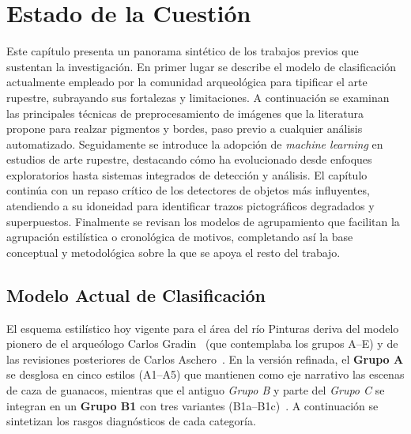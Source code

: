 \section{Estado de la Cuestión}\label{sec:estado_cuestion}

Este capítulo presenta un panorama sintético de los trabajos previos que sustentan la investigación.
En primer lugar se describe el modelo de clasificación actualmente empleado por la comunidad arqueológica para tipificar el arte rupestre, subrayando sus fortalezas y limitaciones.
A continuación se examinan las principales técnicas de preprocesamiento de imágenes que la literatura propone para realzar pigmentos y bordes, paso previo a cualquier análisis automatizado.
Seguidamente se introduce la adopción de \emph{machine learning} en estudios de arte rupestre, destacando cómo ha evolucionado desde enfoques exploratorios hasta sistemas integrados de detección y análisis.
El capítulo continúa con un repaso crítico de los detectores de objetos más influyentes, atendiendo a su idoneidad para identificar trazos pictográficos degradados y superpuestos.
Finalmente se revisan los modelos de agrupamiento que facilitan la agrupación estilística o cronológica de motivos, completando así la base conceptual y metodológica sobre la que se apoya el resto del trabajo.

\subsection{Modelo Actual de Clasificación}

El esquema estilístico hoy vigente para el área del río Pinturas deriva del modelo pionero de el arqueólogo Carlos Gradin~\cite{gradin1979} (que contemplaba los grupos A–E) y de las revisiones posteriores de Carlos Aschero~\cite{aschero2012,aschero2018b}.
En la versión refinada, el \textbf{Grupo A} se desglosa en cinco estilos (A1–A5) que mantienen como eje narrativo las escenas de caza de guanacos, mientras que el antiguo \emph{Grupo B} y parte del \emph{Grupo C} se integran en un \textbf{Grupo B1} con tres variantes (B1a–B1c)~\cite{aschero2021,aschero2023}.
A continuación se sintetizan los rasgos diagnósticos de cada categoría.

